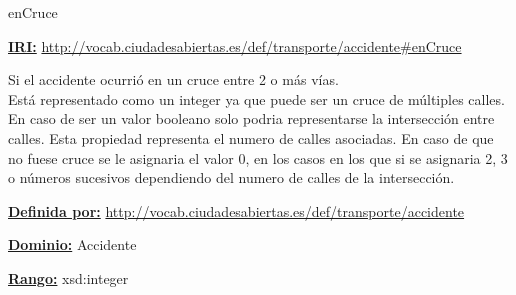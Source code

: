 \begin{mybox}{enCruce}
\begin{flushleft}
\underline{\textbf{IRI:}}
\url{http://vocab.ciudadesabiertas.es/def/transporte/accidente#enCruce}
\newline

Si el accidente ocurrió en un cruce entre 2 o más vías.
\\Está representado como un integer ya que puede ser un cruce de múltiples calles. En caso de ser un valor booleano solo podria representarse la intersección entre calles. Esta propiedad representa el numero de calles asociadas. En caso de que no fuese cruce se le asignaria el valor 0, en los casos en los que si se asignaria 2, 3 o números sucesivos dependiendo del numero de calles de la intersección.
\newline

\underline{\textbf{Definida por:}}\newline
\url{http://vocab.ciudadesabiertas.es/def/transporte/accidente}
\newline

\underline{\textbf{Dominio:}} 	Accidente
\newline

\underline{\textbf{Rango:}} 	xsd:integer
\newline

\end{flushleft}
\end{mybox}








